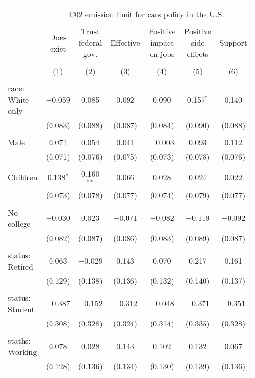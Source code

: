 
\begin{tabular}{@{\extracolsep{5pt}}lcccccc} 
\\[-1.8ex]\hline 
\hline \\[-1.8ex] 
 & \multicolumn{6}{c}{C02 emission limit for cars policy in the U.S.} \\ 
\cline{2-7} 
\\[-1.8ex] & Does exist & Trust federal gov. & Effective & Positive impact on jobs & Positive side effects & Support \\ 
\\[-1.8ex] & (1) & (2) & (3) & (4) & (5) & (6)\\ 
\hline \\[-1.8ex] 
 race: White only & $-$0.059 & 0.085 & 0.092 & 0.090 & 0.157$^{*}$ & 0.140 \\ 
  & (0.083) & (0.088) & (0.087) & (0.084) & (0.090) & (0.088) \\ 
  & & & & & & \\ 
 Male & 0.071 & 0.054 & 0.041 & $-$0.003 & 0.093 & 0.112 \\ 
  & (0.071) & (0.076) & (0.075) & (0.073) & (0.078) & (0.076) \\ 
  & & & & & & \\ 
 Children & 0.138$^{*}$ & 0.160$^{**}$ & 0.066 & 0.028 & 0.024 & 0.022 \\ 
  & (0.073) & (0.078) & (0.077) & (0.074) & (0.079) & (0.077) \\ 
  & & & & & & \\ 
 No college & $-$0.030 & 0.023 & $-$0.071 & $-$0.082 & $-$0.119 & $-$0.092 \\ 
  & (0.082) & (0.087) & (0.086) & (0.083) & (0.089) & (0.087) \\ 
  & & & & & & \\ 
 status: Retired & 0.063 & $-$0.029 & 0.143 & 0.070 & 0.217 & 0.161 \\ 
  & (0.129) & (0.138) & (0.136) & (0.132) & (0.140) & (0.137) \\ 
  & & & & & & \\ 
 status: Student & $-$0.387 & $-$0.152 & $-$0.312 & $-$0.048 & $-$0.371 & $-$0.351 \\ 
  & (0.308) & (0.328) & (0.324) & (0.314) & (0.335) & (0.328) \\ 
  & & & & & & \\ 
 staths: Working & 0.078 & 0.028 & 0.143 & 0.102 & 0.132 & 0.067 \\ 
  & (0.128) & (0.136) & (0.134) & (0.130) & (0.139) & (0.136) \\ 

\end{tabular}
